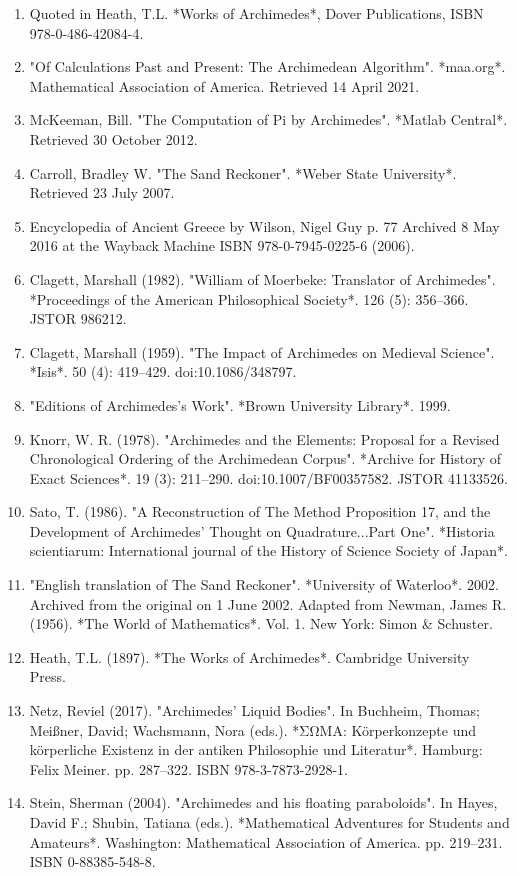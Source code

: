 \begin{enumerate}
\item Quoted in Heath, T.L. *Works of Archimedes*, Dover Publications, ISBN 978-0-486-42084-4.
\item "Of Calculations Past and Present: The Archimedean Algorithm". *maa.org*. Mathematical Association of America. Retrieved 14 April 2021.
\item McKeeman, Bill. "The Computation of Pi by Archimedes". *Matlab Central*. Retrieved 30 October 2012.
\item Carroll, Bradley W. "The Sand Reckoner". *Weber State University*. Retrieved 23 July 2007.
\item Encyclopedia of Ancient Greece by Wilson, Nigel Guy p. 77 Archived 8 May 2016 at the Wayback Machine ISBN 978-0-7945-0225-6 (2006).
\item Clagett, Marshall (1982). "William of Moerbeke: Translator of Archimedes". *Proceedings of the American Philosophical Society*. 126 (5): 356–366. JSTOR 986212.
\item Clagett, Marshall (1959). "The Impact of Archimedes on Medieval Science". *Isis*. 50 (4): 419–429. doi:10.1086/348797.
\item "Editions of Archimedes's Work". *Brown University Library*. 1999.
\item Knorr, W. R. (1978). "Archimedes and the Elements: Proposal for a Revised Chronological Ordering of the Archimedean Corpus". *Archive for History of Exact Sciences*. 19 (3): 211–290. doi:10.1007/BF00357582. JSTOR 41133526.
\item Sato, T. (1986). "A Reconstruction of The Method Proposition 17, and the Development of Archimedes' Thought on Quadrature...Part One". *Historia scientiarum: International journal of the History of Science Society of Japan*.
\item "English translation of The Sand Reckoner". *University of Waterloo*. 2002. Archived from the original on 1 June 2002. Adapted from Newman, James R. (1956). *The World of Mathematics*. Vol. 1. New York: Simon & Schuster.
\item Heath, T.L. (1897). *The Works of Archimedes*. Cambridge University Press.
\item Netz, Reviel (2017). "Archimedes' Liquid Bodies". In Buchheim, Thomas; Meißner, David; Wachsmann, Nora (eds.). *ΣΩΜΑ: Körperkonzepte und körperliche Existenz in der antiken Philosophie und Literatur*. Hamburg: Felix Meiner. pp. 287–322. ISBN 978-3-7873-2928-1.
\item Stein, Sherman (2004). "Archimedes and his floating paraboloids". In Hayes, David F.; Shubin, Tatiana (eds.). *Mathematical Adventures for Students and Amateurs*. Washington: Mathematical Association of America. pp. 219–231. ISBN 0-88385-548-8.\\

\end{enumerate}
